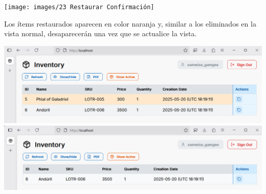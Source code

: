 \texttt{[image: images/23 Restaurar Confirmación]}

Los ítems restaurados aparecen en color naranja y, similar a los eliminados en la vista normal, desaparecerán una vez que se actualice la vista.

\includegraphics[width=\textwidth]{images/24 Restaurado}
\includegraphics[width=\textwidth]{images/25 Eliminados Actualizado}
